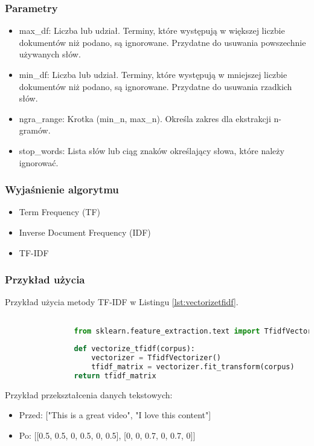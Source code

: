 		
		\subsubsection{Parametry}
			\begin{itemize}
				\item max\_df: Liczba lub udział. Terminy, które występują w większej liczbie dokumentów niż podano, są ignorowane. Przydatne do usuwania powszechnie używanych słów.
				\item min\_df: Liczba lub udział. Terminy, które występują w mniejszej liczbie dokumentów niż podano, są ignorowane. Przydatne do usuwania rzadkich słów.
				\item ngra\_range: Krotka (min\_n, max\_n). Określa zakres dla ekstrakcji n-gramów.
				\item stop\_words: Lista słów lub ciąg znaków określający słowa, które należy ignorować.
			\end{itemize}
		
		\subsubsection{Wyjaśnienie algorytmu}
			\begin{itemize}
				\item Term Frequency (TF)
				\item Inverse Document Frequency (IDF)
				\item TF-IDF
			\end{itemize}
			
				
		\subsubsection{Przykład użycia}
			Przykład użycia metody TF-IDF w Listingu \ref{lst:vectorizetfidf}.
			\begin{lstlisting}[language=Python, caption={Funkcja wektoryzująca korpus za pomocą TF-IDF}, label={lst:vectorizetfidf}]

				from sklearn.feature_extraction.text import TfidfVectorizer
	
				def vectorize_tfidf(corpus):
					vectorizer = TfidfVectorizer()
					tfidf_matrix = vectorizer.fit_transform(corpus)
				return tfidf_matrix
			\end{lstlisting}

			Przykład przekształcenia danych tekstowych:	
			\begin{itemize}
				\item Przed: ["This is a great video", "I love this content"]
				\item Po: [[0.5, 0.5, 0, 0.5, 0, 0.5], [0, 0, 0.7, 0, 0.7, 0]]
			\end{itemize}
			
